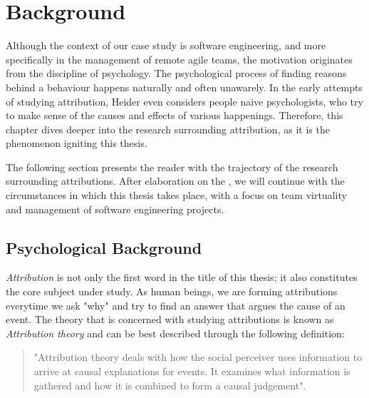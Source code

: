 \chapter{Background}


Although the context of our case study is software engineering, and more specifically in the management of remote agile teams,  the motivation originates from the discipline of psychology.  The psychological process of finding reasons behind a behaviour happens naturally and often unawarely. In the early attempts of studying attribution, Heider \cite{Heider1958} even considers people naive psychologists, who try to make sense of the causes and effects of various happenings. Therefore, this chapter dives deeper into the research surrounding attribution, as it is the phenomenon igniting this thesis. 

The following section presents the reader with the trajectory of the research surrounding attributions.  After elaboration on the \textit{},  we will continue with the circumstances in which this thesis takes place, with a focus on team virtuality and management of software engineering projects.   


\section{Psychological Background} \label{PsychologicalBackground}

\textit{Attribution} is not only the first word in the title of this thesis; it also constitutes the core subject under study. As human beings, we are forming attributions everytime we ask "why" and try to find an answer that argues the cause of an event. The theory that is concerned with studying attributions is known as \textit{Attribution theory} and can be best described through the following definition: 

\begin{quote}
"Attribution theory deals with how the social perceiver uses information to arrive at causal explanations for events. It examines what information is gathered and how it is combined to form a causal judgement". \cite{Fiske1991}
\end{quote}


